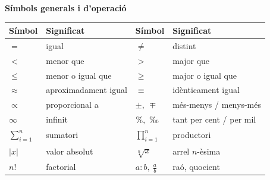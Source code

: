 \small\renewcommand{\arraystretch}{1.55}
\newcommand{\sym}[1]{\begin{tabular}{@{}p{2.5cm}p{5.1cm}@{\hspace{1em}}p{2.5cm}p{5.1cm}@{}}\toprule\textbf{Símbol}&\textbf{Significat}&\textbf{Símbol}&\textbf{Significat}\\\midrule #1 \\\bottomrule\end{tabular}}
\textbf{Símbols generals i d'operació}\par\vspace{2pt}
\sym{
$=$ & igual & $\neq$ & distint \\
$<$ & menor que & $>$ & major que \\
$\le$ & menor o igual que & $\ge$ & major o igual que \\
$\approx$ & aproximadament igual & $\equiv$ & idènticament igual \\
$\propto$ & proporcional a & $\pm,\ \mp$ & més-menys / menys-més \\
$\infty$ & infinit & $\%,\ \text{\textperthousand}$ & tant per cent / per mil \\
$\sum_{i=1}^{n}$ & sumatori & $\prod_{i=1}^{n}$ & productori \\
$|x|$ & valor absolut & $\sqrt[n]{x}$ & arrel $n$-èsima \\
$n!$ & factorial & $a:b,\ \frac ab$ & raó, quocient}
\vspace{0.8em}

